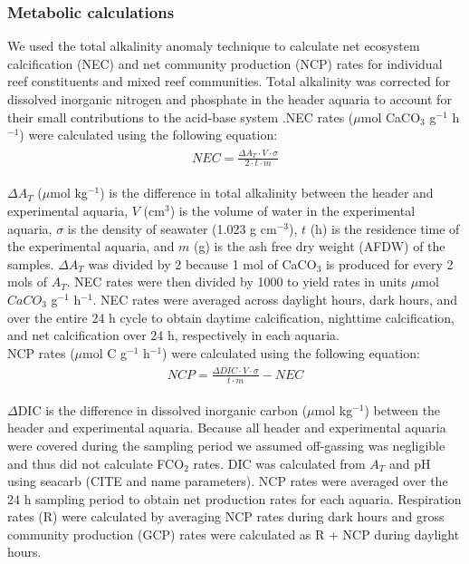 \documentclass[]{rsos}%
\begin{document}
\subsubsection{ Metabolic calculations}
We used the total alkalinity anomaly technique to calculate net ecosystem calcification (NEC) and net community production (NCP) rates for individual reef constituents and mixed reef communities. Total alkalinity was corrected for dissolved inorganic nitrogen and phosphate in the header aquaria to account for their small contributions to the acid-base system \cite{wolf2007total}.NEC rates ($\mu$mol CaCO$_3$ g$^{-1}$ h$^{-1}$) were calculated using the following equation: 
\begin{align}
\label{1.1}
\begin{split}
NEC  = \frac{\Delta A_{T} \cdot V \cdot \sigma}{2\cdot t\cdot  m}
\end{split}
\end{align}

$\Delta A_{T}$  ($\mu$mol kg$^{-1}$) is the difference in total alkalinity between the header and experimental aquaria, $V$  (cm$^{3}$) is the volume of water in the experimental aquaria, $\sigma$ is the density of seawater (1.023 g cm$^{-3}$), $t$  (h) is the residence time of the experimental aquaria, and $m$ (g) is the ash free dry weight (AFDW) of the samples. $\Delta A_{T}$ was divided by 2 because 1 mol of CaCO$_3$ is produced for every 2 mols of $A_{T}$. NEC rates were then divided by 1000 to yield rates in units $\mu$mol $CaCO_3$ g$^{-1}$ h$^{-1}$. NEC rates were averaged across daylight hours, dark hours, and over the entire 24 h cycle to obtain daytime calcification, nighttime calcification, and net calcification over 24 h, respectively in each aquaria. \\
\indent NCP rates ($\mu$mol C g$^{-1}$ h$^{-1}$) were calculated using the following equation:
\begin{align}
\label{1.2}
\begin{split}
NCP  = \frac{\Delta DIC \cdot V \cdot \sigma}{t\cdot  m}-NEC
\end{split}
\end{align}

$\Delta$DIC is the difference in dissolved inorganic carbon ($\mu$mol kg$^{-1}$) between the header and experimental aquaria. Because all header and experimental aquaria were covered during the sampling period we assumed off-gassing was negligible and thus did not calculate FCO$_2$ rates. DIC was calculated from $A_{T}$ and pH using seacarb (CITE and name parameters). NCP rates were averaged over the 24 h sampling period to obtain net production rates for each aquaria. Respiration rates (R) were calculated by averaging NCP rates during dark hours and gross community production (GCP) rates were calculated as R + NCP during daylight hours.
\end{document}
